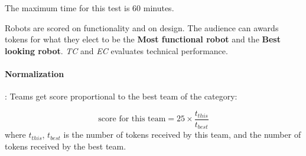 The maximum time for this test is 60 minutes.

Robots are scored on functionality and on design. The audience can awards tokens for what they elect to be the \textbf{Most functional robot} and the \textbf{Best looking robot}. \textit{TC} and \textit{EC} evaluates technical performance.

\renewcommand{\dataRecordingBonus}{false}
\begin{scorelist}


\end{scorelist}

\paragraph*{Normalization}: Teams get score proportional to the best team of the category:

$$\text{score for this team} = 25 \times \frac{t_{this}}{t_{best}}$$
where $t_{this}$, $t_{best}$ is the number of tokens received by this team, and the number of tokens received by the best team.

\renewcommand{\dataRecordingBonus}{true}
